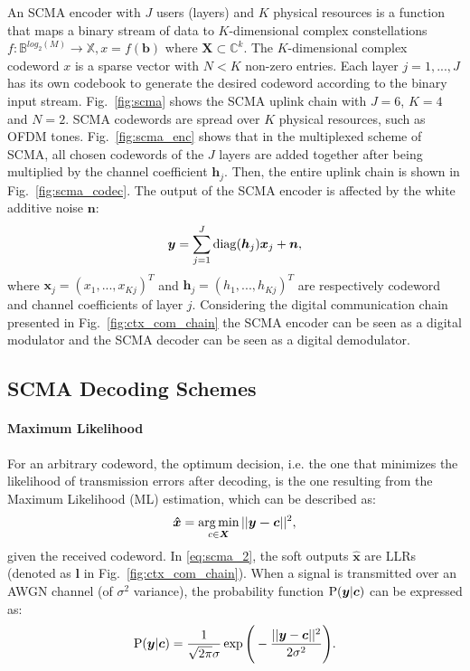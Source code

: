 An SCMA encoder with $J$ users (layers) and $K$ physical resources is a function
that maps a binary stream of data to $K$-dimensional complex constellations
$f : \mathbb{B}^{log_{2}(M)} \rightarrow \mathbb{X}, x = f(\bm{b})$ where
$\bm{X} \subset \mathbb{C}^k$. The $K$-dimensional complex codeword $x$ is a
sparse vector with $N < K$ non-zero entries. Each layer $j=1, ..., J$ has its
own codebook to generate the desired codeword according to the binary input
stream. Fig.~\ref{fig:scma} shows the SCMA uplink chain with $J = 6$, $K = 4$
and $N = 2$. SCMA codewords are spread over $K$ physical resources, such as OFDM
tones. Fig.~\ref{fig:scma_enc} shows that in the multiplexed scheme of SCMA, all
chosen codewords of the $J$ layers are added together after being multiplied by
the channel coefficient $\bm{h}_j$. Then, the entire uplink chain is shown in
Fig.~\ref{fig:scma_codec}. The output of the SCMA encoder is affected by the
white additive noise $\bm{n}$:
\begin{equation}
  \label{eq:scma_1}
  \bm{y} = \sum\limits_{j=1}^J \operatorname{diag}(\bm{h}_j)\bm{x}_j+\bm{n},
\end{equation}
where $\bm{x}_j=(x_1,...,x_{Kj})^T$ and $\bm{h}_j=(h_1,...,h_{Kj})^T$ are
respectively codeword and channel coefficients of layer $j$.
Considering the digital communication chain presented in
Fig.~\ref{fig:ctx_com_chain} the SCMA encoder can be seen as a digital modulator
and the SCMA decoder can be seen as a digital demodulator.

\subsection{SCMA Decoding Schemes}
\label{sec:scma_detection}

\paragraph{Maximum Likelihood}
\label{sec:scma_ml}

For an arbitrary codeword, the optimum decision, i.e. the one that minimizes the
likelihood of transmission errors after decoding, is the one resulting from the
Maximum Likelihood (ML) estimation, which can be described as:
\begin{equation}
  \label{eq:scma_2}
  \bm{\hat{x}} = \operatorname*{arg\,min}_{c \in \bm{X}}||\bm{y - c}||^2,
\end{equation}
given the received codeword. In \eqref{eq:scma_2}, the soft outputs
$\hat{\bm{x}}$ are LLRs (denoted as $\bm{l}$ in Fig.~\ref{fig:ctx_com_chain}).
When a signal is transmitted over an AWGN channel (of $\sigma^2$ variance), the
probability function $\operatorname{P}(\bm{y}|\bm{c})$ can be expressed as:
\begin{equation}
  \label{eq:scma_4}
  \operatorname{P}(\bm{y}|\bm{c}) = \frac{1}{\sqrt{2\pi}\sigma}\exp
  \Bigg(-\frac{||\bm{y}-\bm{c}||^2}{2\sigma^2}\Bigg).
\end{equation}


